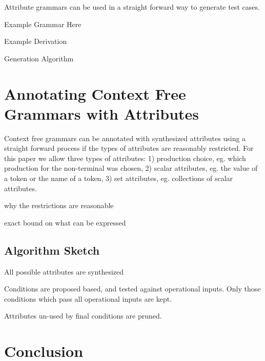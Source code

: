 \documentclass[12pt]{article}
\begin{document}
\begin{multicols}{2}
Attribute grammars can be used in a straight forward way to generate test cases. 

Example Grammar Here

Example Derivation

Generation Algorithm

\section{Annotating Context Free Grammars with Attributes}

Context free grammars can be annotated with synthesized attributes using a
straight forward process if the types of attributes are reasonably restricted.
For this paper we allow three types of attributes: 1) production choice, eg.
which production for the non-terminal was chosen, 2) scalar attributes, eg. the
value of a token or the name of a token, 3) set attributes, eg. collections of
scalar attributes. 

why the restrictions are reasonable 

exact bound on what can be expressed

\subsection{Algorithm Sketch}

All possible attributes are synthesized

Conditions are proposed based, and tested against operational inputs. Only those
conditions which pass all operational inputs are kept.

Attributes un-used by final conditions are pruned.

\section{Conclusion}

\nocite{*}



\end{multicols}
\end{document}
